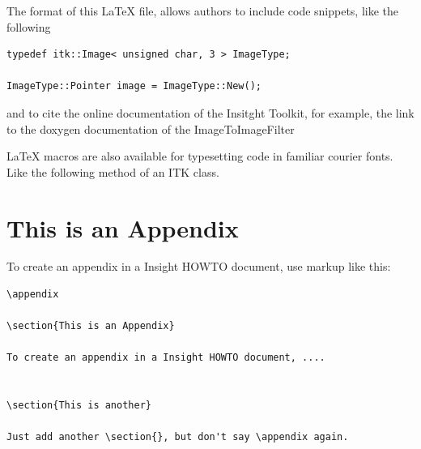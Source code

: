 \documentclass{InsightArticle}
\begin{document}
The format of this LaTeX file, allows authors to include code snippets, like
the following

\small
\begin{verbatim}
typedef itk::Image< unsigned char, 3 > ImageType;

ImageType::Pointer image = ImageType::New();
\end{verbatim}
\normalsize

and to cite the online documentation of the Insitght Toolkit, for example, the
link to the doxygen documentation of the ImageToImageFilter


LaTeX macros are also available for typesetting code in familiar courier fonts.
Like the following method of an ITK class.







\appendix

\section{This is an Appendix}

To create an appendix in a Insight HOWTO document, use markup like
this:

\begin{verbatim}
\appendix

\section{This is an Appendix}

To create an appendix in a Insight HOWTO document, ....


\section{This is another}

Just add another \section{}, but don't say \appendix again.
\end{verbatim}
\end{document}

